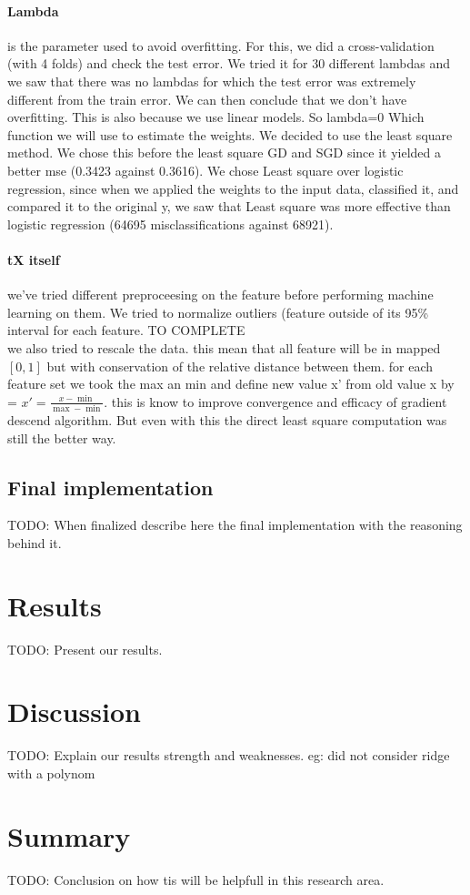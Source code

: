 \documentclass[10pt,conference,compsocconf]{IEEEtran}
\begin{document}
\paragraph{Lambda} is the parameter used to avoid overfitting. For this, we did a cross-validation (with 4 folds) and check the test error. We tried it for 30 different lambdas and we saw that there was no lambdas for which the test error was extremely different from the train error. We can then conclude that we don’t have overfitting. This is also because we use linear models. So lambda=0
 Which function we will use to estimate the weights. We decided to use the least square method. We chose this before the least square GD and SGD since it yielded a better mse (0.3423 against 0.3616). We chose Least square over logistic regression, since when we applied the weights to the input data, classified it, and compared it to the original y, we saw that Least square was more effective than logistic regression (64695 misclassifications against 68921).
\paragraph{tX itself} we've tried different preproceesing on the feature before performing machine learning on them. We tried to normalize outliers (feature outside of its 95\%  interval for each feature. TO COMPLETE\\
we also tried to rescale the data. this mean that all feature will be in mapped \( [0,1] \) but with conservation of the relative distance between them. for each feature set we took the max an min and define new value x' from old value x by = \( x' = \frac{x-\min}{\max - \min }\). this is know to improve convergence and efficacy of gradient descend algorithm. But even with this the direct least square computation was still the better way.
\subsection{Final implementation}

TODO: When finalized describe here the final implementation with the reasoning behind it.

\section{Results}
TODO: Present our results.

\section{Discussion}
TODO: Explain our results strength and weaknesses.
eg: did not consider ridge with a polynom

\section{Summary}
TODO: Conclusion on how tis will be helpfull in this research area.



\end{document}
